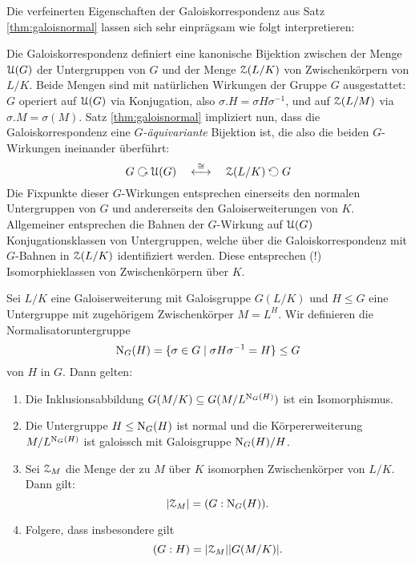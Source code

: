 \documentclass{book}
\begin{document}
\begin{rem}
    \label{rem:galoisoperation}
    Die verfeinerten Eigenschaften der Galoiskorrespondenz aus Satz
    \ref{thm:galoisnormal} lassen sich sehr einprägsam wie folgt
    interpretieren: 

    Die Galoiskorrespondenz definiert eine kanonische Bijektion
    zwischen der Menge $\EuScript{U}(G)$ der Untergruppen von $G$ und der Menge
    $\EuScript{Z}(L/K)$ von Zwischenkörpern von $L/K$. Beide Mengen sind mit natürlichen
    Wirkungen der Gruppe $G$ ausgestattet: $G$ operiert auf $\EuScript{U}(G)$ via
    Konjugation, also $\sigma.H = \sigma H \sigma^{-1}$, und auf $\EuScript{Z}(L/M)$ via
    $\sigma.M = \sigma(M)$. 
    Satz \ref{thm:galoisnormal} impliziert nun, dass die Galoiskorrespondenz eine 
    \emph{$G$-äquivariante} Bijektion ist, die also die beiden $G$-Wirkungen
    ineinander überführt: 
    \[
        G \actson \eU(G) \quad \overset{\cong}{\longleftrightarrow} \quad \eZ(L/K) \actsonright G
    \]
    Die Fixpunkte dieser $G$-Wirkungen entsprechen
    einerseits den normalen Untergruppen von $G$ und andererseits den
    Galoiserweiterungen von $K$. Allgemeiner entsprechen die Bahnen der
    $G$-Wirkung auf $\EuScript{U}(G)$ Konjugationsklassen von Untergruppen, welche über
    die Galoiskorrespondenz mit $G$-Bahnen in $\EuScript{Z}(L/K)$ identifiziert werden.
    Diese entsprechen (!) Isomorphieklassen von Zwischenkörpern über $K$. 
\end{rem}

\begin{prob}
    \label{prob:verfeinerung}
    Sei $L/K$ eine Galoiserweiterung mit Galoisgruppe $G(L/K)$ und $H \le G$
    eine Untergruppe mit zugehörigem Zwischenkörper $M = L^H$. Wir definieren
    die Normalisatoruntergruppe 
    \[
        \operatorname{N}_G(H) = \{ \sigma \in G \; | \; \sigma H \sigma^{-1} = H \} \le G
    \]
    von $H$ in $G$. Dann gelten:
    \begin{enumerate}
        \item Die Inklusionsabbildung $G(M/K) \subseteq G(M/L^{\operatorname{N}_G(H)})$ ist ein Isomorphismus. 
        \item Die Untergruppe $H \le \operatorname{N}_G(H)$ ist normal und die
            Körpererweiterung $M/L^{\operatorname{N}_G(H)}$ ist galoissch mit Galoisgruppe
            $\operatorname{N}_G(H)/H$. 
        \item Sei $\EuScript{Z}_M$ die Menge der zu $M$ über $K$ isomorphen
            Zwischenkörper von $L/K$. Dann gilt: 
            \[
                |\EuScript{Z}_M| = (G:\operatorname{N}_G(H)).
            \]
        \item Folgere, dass insbesondere gilt
            \[
                (G:H) = |\EuScript{Z}_M| |G(M/K)|.
            \]
    \end{enumerate}
\end{prob}
\end{document}

